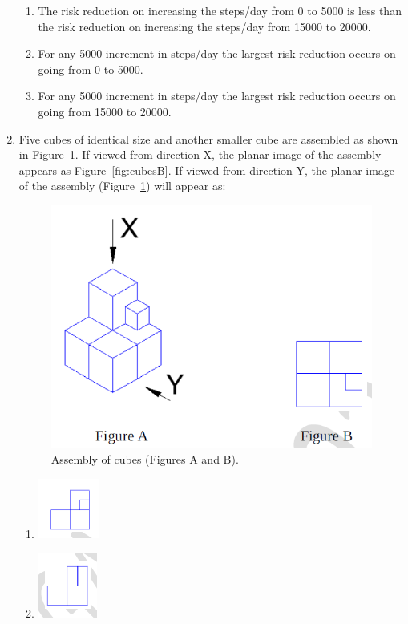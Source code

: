 \documentclass[journal]{IEEEtran}
\begin{document}
\begin{enumerate}[leftmargin=0pt]
\begin{enumerate}
\item The risk reduction on increasing the steps/day from 0 to 5000 is less than the risk reduction on increasing the steps/day from 15000 to 20000.
\item For any 5000 increment in steps/day the largest risk reduction occurs on going from 0 to 5000.
\item For any 5000 increment in steps/day the largest risk reduction occurs on going from 15000 to 20000.
\end{enumerate}
\hfill{}
\item Five cubes of identical size and another smaller cube are assembled as shown in Figure~\ref{fig:cubesA}. 
If viewed from direction X, the planar image of the assembly appears as Figure~\ref{fig:cubesB}. 
If viewed from direction Y, the planar image of the assembly (Figure~\ref{fig:cubesA}) will appear as:

\begin{figure}[h!]
    \centering
    \includegraphics[width=0.35\linewidth]{figs/cubes.png}
    \caption{Assembly of cubes (Figures A and B).}
    \label{fig:cubesA}
\end{figure}

\begin{enumerate}
    \item \begin{minipage}[t]{0.8\linewidth}\raggedright
              \includegraphics[width=0.25\linewidth]{figs/9a.png}\\
          \end{minipage}

    \item \begin{minipage}[t]{0.8\linewidth}\raggedright
              \includegraphics[width=0.25\linewidth]{figs/9b.png}\\
          \end{minipage}


\end{enumerate}
\end{enumerate}
\end{document}
